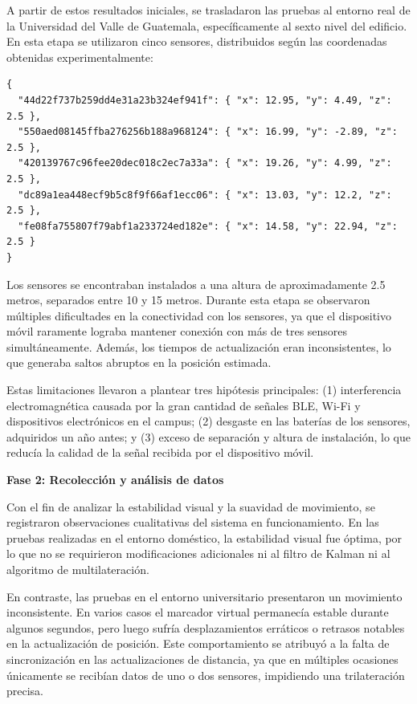 A partir de estos resultados iniciales, se trasladaron las pruebas al entorno real de la Universidad del Valle de Guatemala, específicamente al sexto nivel del edificio. En esta etapa se utilizaron cinco sensores, distribuidos según las coordenadas obtenidas experimentalmente:

\begin{verbatim}
{
  "44d22f737b259dd4e31a23b324ef941f": { "x": 12.95, "y": 4.49, "z": 2.5 },
  "550aed08145ffba276256b188a968124": { "x": 16.99, "y": -2.89, "z": 2.5 },
  "420139767c96fee20dec018c2ec7a33a": { "x": 19.26, "y": 4.99, "z": 2.5 },
  "dc89a1ea448ecf9b5c8f9f66af1ecc06": { "x": 13.03, "y": 12.2, "z": 2.5 },
  "fe08fa755807f79abf1a233724ed182e": { "x": 14.58, "y": 22.94, "z": 2.5 }
}
\end{verbatim}

Los sensores se encontraban instalados a una altura de aproximadamente 2.5 metros, separados entre 10 y 15 metros. Durante esta etapa se observaron múltiples dificultades en la conectividad con los sensores, ya que el dispositivo móvil raramente lograba mantener conexión con más de tres sensores simultáneamente. Además, los tiempos de actualización eran inconsistentes, lo que generaba saltos abruptos en la posición estimada. %

Estas limitaciones llevaron a plantear tres hipótesis principales: (1) interferencia electromagnética causada por la gran cantidad de señales BLE, Wi-Fi y dispositivos electrónicos en el campus; (2) desgaste en las baterías de los sensores, adquiridos un año antes; y (3) exceso de separación y altura de instalación, lo que reducía la calidad de la señal recibida por el dispositivo móvil. %


\textbf{Fase 2: Recolección y análisis de datos}

Con el fin de analizar la estabilidad visual y la suavidad de movimiento, se registraron observaciones cualitativas del sistema en funcionamiento. En las pruebas realizadas en el entorno doméstico, la estabilidad visual fue óptima, por lo que no se requirieron modificaciones adicionales ni al filtro de Kalman ni al algoritmo de multilateración. %

En contraste, las pruebas en el entorno universitario presentaron un movimiento inconsistente. En varios casos el marcador virtual permanecía estable durante algunos segundos, pero luego sufría desplazamientos erráticos o retrasos notables en la actualización de posición. Este comportamiento se atribuyó a la falta de sincronización en las actualizaciones de distancia, ya que en múltiples ocasiones únicamente se recibían datos de uno o dos sensores, impidiendo una trilateración precisa. %

